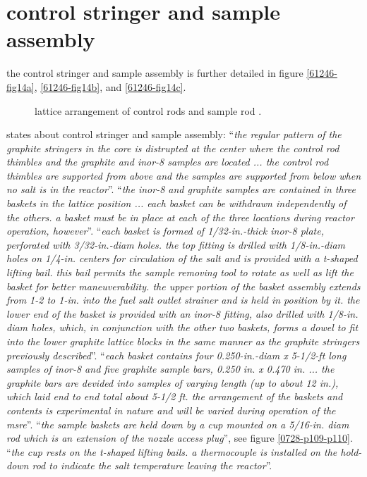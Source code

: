 \documentclass{article}
\newcommand*{\mrsarchive}{../../msr-archive}%
\begin{document}
\section{control stringer and sample assembly}
the control stringer and sample assembly is further detailed in figure \ref{61246-fig14a}, \ref{61246-fig14b}, and \ref{61246-fig14c}.
\begin{figure}[H]
  \centering
  \caption{lattice arrangement of control rods and sample rod \parencite[figure 5.7]{ornl-tm-0728}.}
  \label{0728-fig5-7}
\end{figure}

\parencite[page 81 and 84]{ornl-tm-0728} states about control stringer and sample assembly:
\enquote{\textit{the regular pattern of the graphite stringers in the core is distrupted at the center where the control rod thimbles and the graphite and inor-8 samples are located ... the control rod thimbles are supported from above and the samples are supported from below when no salt is in the reactor}}.
\enquote{\textit{the inor-8 and graphite samples are contained in three baskets in the lattice position ... each basket can be withdrawn independently of the others. a basket must be in place at each of the three locations during reactor operation, however}}.
\enquote{\textit{each basket is formed of 1/32-in.-thick inor-8 plate, perforated with 3/32-in.-diam holes. the top fitting is drilled with 1/8-in.-diam holes on 1/4-in. centers for circulation of the salt and is provided with a t-shaped lifting bail. this bail permits the sample removing tool to rotate as well as lift the basket for better maneuverability. the upper portion of the basket assembly extends from 1-2 to 1-in. into the fuel salt outlet strainer and is held in position by it. the lower end of the basket is provided with an inor-8 fitting, also drilled with 1/8-in. diam holes, which, in conjunction with the other two baskets, forms a dowel to fit into the lower graphite lattice blocks in the same manner as the graphite stringers previously described}}.
\enquote{\textit{each basket contains four 0.250-in.-diam x 5-1/2-ft long samples of inor-8 and five graphite sample bars, 0.250 in. x 0.470 in. ... the graphite bars are devided into samples of varying length (up to about 12 in.), which laid end to end total about 5-1/2 ft. the arrangement of the baskets and contents is experimental in nature and will be varied during operation of the msre}}.
\enquote{\textit{the sample baskets are held down by a cup mounted on a 5/16-in. diam rod which is an extension of the nozzle access plug}}, see figure \ref{0728-p109-p110}.
\enquote{\textit{the cup rests on the t-shaped lifting bails. a thermocouple is installed on the hold-down rod to indicate the salt temperature leaving the reactor}}.
\end{document}
